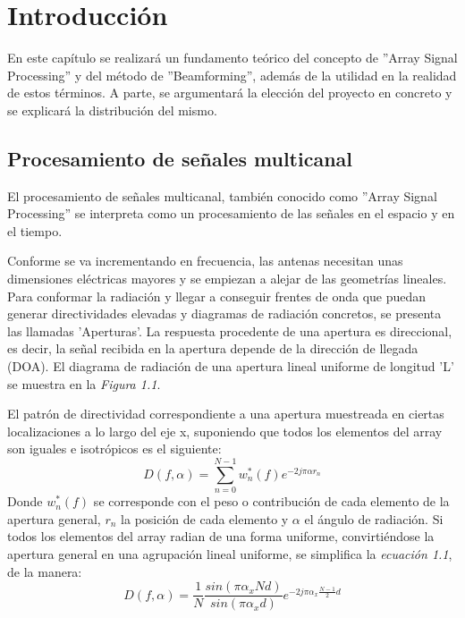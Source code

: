 \documentclass[a4paper,11pt]{book}
\begin{document}


\frontmatter
\tableofcontents
%
\mainmatter
\setlength{\parskip}{5pt}

\chapter{Introducción}
En este capítulo se realizará un fundamento teórico del concepto de ''Array Signal Processing'' y del método de ''Beamforming'', además de la utilidad en la realidad de estos términos. A parte, se argumentará la elección del proyecto en concreto y se explicará la distribución del mismo.
	\section{Procesamiento de señales multicanal}
	El procesamiento de señales multicanal, también conocido como ''Array Signal Processing'' se interpreta como un procesamiento de las señales en el espacio y en el tiempo.
	
	Conforme se va incrementando en frecuencia, las antenas necesitan unas dimensiones eléctricas mayores y se empiezan a alejar de las geometrías lineales. Para conformar la radiación y llegar a conseguir frentes de onda que puedan generar directividades elevadas y diagramas de radiación concretos, se presenta las llamadas 'Aperturas'. La respuesta procedente de una apertura es direccional, es decir, la señal recibida en la apertura depende de la dirección de llegada (DOA). El diagrama de radiación de una apertura lineal uniforme de longitud 'L' se muestra en la \textit{Figura 1.1}.
	
	El patrón de directividad correspondiente a una apertura muestreada en ciertas localizaciones a lo largo del eje x, suponiendo que todos los elementos del array son iguales e isotrópicos es el siguiente:
	\begin{equation}
	 D(f, \alpha) = \sum_{n = 0}^{N-1}w^{*}_{n}(f)e^{-2j \pi \alpha r_{n}}
	\end{equation}
	Donde $w^{*}_{n}(f)$ se corresponde con el peso o contribución de cada elemento de la apertura general, $r_{n}$ la posición de cada elemento y $\alpha$ el ángulo de radiación. Si todos los elementos del array radian de una forma uniforme, convirtiéndose la apertura general en una agrupación lineal uniforme, se simplifica la \textit{ecuación 1.1}, de la manera:
	\begin{equation}
		 D(f, \alpha) =\frac{1}{N}\frac{sin(\pi \alpha_{x} N d)}{sin(\pi \alpha_{x} d)} e^{-2j \pi \alpha_{x} \frac{N-1}{2} d}
	\end{equation}
	
\end{document}

